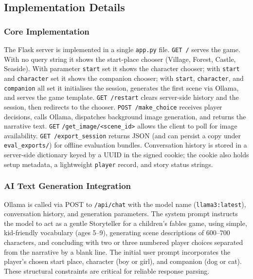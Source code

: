 \documentclass[12pt,a4paper]{article}
\newcommand{\breakablegetimage}[1]{\texttt{/get\_image/}\allowbreak\texttt{#1}}
\begin{document}
    \subsection{Implementation Details}

\subsubsection{Core Implementation}

The Flask server is implemented in a single \texttt{app.py} file. \texttt{GET /} serves the game. With no query string it shows the start-place chooser (Village, Forest, Castle, Seaside). With parameter \texttt{start} set it shows the character chooser; with \texttt{start} and \texttt{character} set it shows the companion chooser; with \texttt{start}, \texttt{character}, and \texttt{companion} all set it initialises the session, generates the first scene via Ollama, and serves the game template. \texttt{GET /restart} clears server-side history and the session, then redirects to the chooser. \texttt{POST /make\_choice} receives player decisions, calls Ollama, dispatches background image generation, and returns the narrative text. \texttt{GET} \breakablegetimage{<scene\_id>} allows the client to poll for image availability. \texttt{GET /export\_session} returns JSON (and can persist a copy under \texttt{eval\_exports/}) for offline evaluation bundles. Conversation history is stored in a server-side dictionary keyed by a UUID in the signed cookie; the cookie also holds setup metadata, a lightweight \texttt{player} record, and story status strings.

    \subsubsection{AI Text Generation Integration}

Ollama is called via POST to \texttt{/api/chat} with the model name (\texttt{llama3:latest}), conversation history, and generation parameters. The system prompt instructs the model to act as a gentle Storyteller for a children's fables game, using simple, kid-friendly vocabulary (ages 5--9), generating scene descriptions of 600--700 characters, and concluding with two or three numbered player choices separated from the narrative by a blank line. The initial user prompt incorporates the player's chosen start place, character (boy or girl), and companion (dog or cat). These structural constraints are critical for reliable response parsing.
\end{document}
